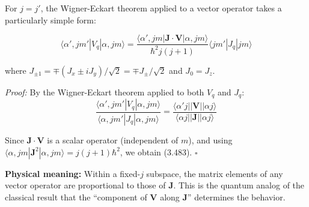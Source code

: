 \documentclass[11pt,a4paper]{article}
\begin{document}
For $j = j'$, the Wigner-Eckart theorem applied to a vector operator takes a particularly simple form:

\begin{tcolorbox}[colback=green!5!white, colframe=green!75!black, title=Projection Theorem]
\begin{equation}
\boxed{\langle\alpha', jm'|V_q|\alpha, jm\rangle = \frac{\langle\alpha', jm|\mathbf{J}\cdot\mathbf{V}|\alpha, jm\rangle}{\hbar^2 j(j+1)}\langle jm'|J_q|jm\rangle}
\tag{3.483}
\end{equation}
\end{tcolorbox}

where $J_{\pm 1} = \mp(J_x \pm iJ_y)/\sqrt{2} = \mp J_\pm/\sqrt{2}$ and $J_0 = J_z$.

\textit{Proof:} By the Wigner-Eckart theorem applied to both $V_q$ and $J_q$:
\begin{equation}
\frac{\langle\alpha', jm'|V_q|\alpha, jm\rangle}{\langle\alpha, jm'|J_q|\alpha, jm\rangle} = \frac{\langle\alpha' j||\mathbf{V}||\alpha j\rangle}{\langle\alpha j||\mathbf{J}||\alpha j\rangle}
\tag{3.487}
\end{equation}

Since $\mathbf{J}\cdot\mathbf{V}$ is a scalar operator (independent of $m$), and using $\langle\alpha, jm|\mathbf{J}^2|\alpha, jm\rangle = j(j+1)\hbar^2$, we obtain (3.483). $\square$

\textbf{Physical meaning:} Within a fixed-$j$ subspace, the matrix elements of any vector operator are proportional to those of $\mathbf{J}$. This is the quantum analog of the classical result that the ``component of $\mathbf{V}$ along $\mathbf{J}$'' determines the behavior.
\end{document}
